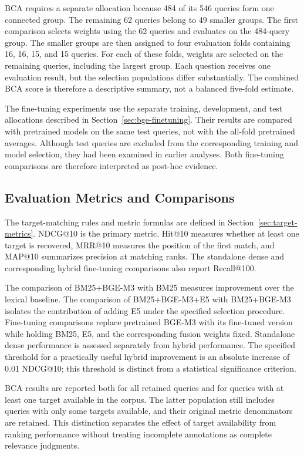 BCA requires a separate allocation because 484 of its 546 queries form one connected group. The remaining 62 queries belong to 49 smaller groups. The first comparison selects weights using the 62 queries and evaluates on the 484-query group. The smaller groups are then assigned to four evaluation folds containing 16, 16, 15, and 15 queries. For each of these folds, weights are selected on the remaining queries, including the largest group. Each question receives one evaluation result, but the selection populations differ substantially. The combined BCA score is therefore a descriptive summary, not a balanced five-fold estimate.

The fine-tuning experiments use the separate training, development, and test allocations described in Section~\ref{sec:bge-finetuning}. Their results are compared with pretrained models on the same test queries, not with the all-fold pretrained averages. Although test queries are excluded from the corresponding training and model selection, they had been examined in earlier analyses. Both fine-tuning comparisons are therefore interpreted as post-hoc evidence.

\subsection{Evaluation Metrics and Comparisons}

The target-matching rules and metric formulas are defined in Section~\ref{sec:target-metrics}. NDCG@10 is the primary metric. Hit@10 measures whether at least one target is recovered, MRR@10 measures the position of the first match, and MAP@10 summarizes precision at matching ranks. The standalone dense and corresponding hybrid fine-tuning comparisons also report Recall@100.

The comparison of BM25+BGE-M3 with BM25 measures improvement over the lexical baseline. The comparison of BM25+BGE-M3+E5 with BM25+BGE-M3 isolates the contribution of adding E5 under the specified selection procedure. Fine-tuning comparisons replace pretrained BGE-M3 with its fine-tuned version while holding BM25, E5, and the corresponding fusion weights fixed. Standalone dense performance is assessed separately from hybrid performance. The specified threshold for a practically useful hybrid improvement is an absolute increase of 0.01 NDCG@10; this threshold is distinct from a statistical significance criterion.

BCA results are reported both for all retained queries and for queries with at least one target available in the corpus. The latter population still includes queries with only some targets available, and their original metric denominators are retained. This distinction separates the effect of target availability from ranking performance without treating incomplete annotations as complete relevance judgments.

